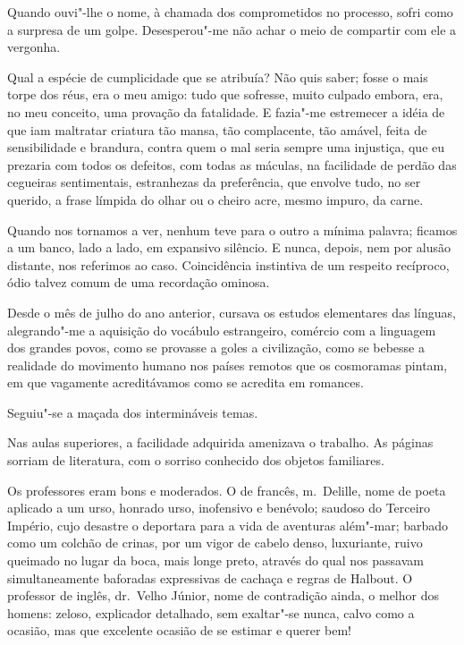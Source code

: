 Quando ouvi"-lhe o nome, à chamada dos
comprometidos no processo, sofri como a surpresa de um golpe.
Desesperou"-me não achar o meio de compartir com ele a vergonha. 

Qual a espécie de cumplicidade que se atribuía? Não quis saber; fosse o mais
torpe dos réus, era o meu amigo: tudo que sofresse, muito culpado
embora, era, no meu conceito, uma provação da fatalidade. E fazia"-me
estremecer a idéia de que iam maltratar criatura tão mansa, tão
complacente, tão amável, feita de sensibilidade e brandura, contra quem
o mal seria sempre uma injustiça, que eu prezaria com todos os
defeitos, com todas as máculas, na facilidade de perdão das cegueiras
sentimentais, estranhezas da preferência, que envolve tudo, no ser
querido, a frase límpida do olhar ou o cheiro acre, mesmo impuro, da
carne. 

Quando nos tornamos a ver, nenhum teve para o outro a mínima
palavra; ficamos a um banco, lado a lado, em expansivo silêncio. E
nunca, depois, nem por alusão distante, nos referimos ao caso.
Coincidência instintiva de um respeito recíproco, ódio talvez comum de
uma recordação ominosa. 

Desde o mês de julho do ano anterior, cursava
os estudos elementares das línguas, alegrando"-me a aquisição do
vocábulo estrangeiro, comércio com a linguagem dos grandes povos, como
se provasse a goles a civilização, como se bebesse a realidade do
movimento humano nos países remotos que os cosmoramas pintam, em que
vagamente acreditávamos como se acredita em romances. 

Seguiu"-se a maçada dos intermináveis temas. 

Nas aulas superiores, a facilidade
adquirida amenizava o trabalho. As páginas sorriam de literatura, com o
sorriso conhecido dos objetos familiares.

Os professores eram bons e moderados. O de francês, m.~Delille, nome de
poeta aplicado a um urso, honrado urso, inofensivo e benévolo; saudoso
do Terceiro Império, cujo desastre o deportara para a vida de aventuras
além"-mar; barbado como um colchão de crinas, por um vigor de cabelo
denso, luxuriante, ruivo queimado no lugar da boca, mais longe preto,
através do qual nos passavam simultaneamente baforadas expressivas de
cachaça e regras de Halbout. O professor de inglês, dr.~Velho Júnior,
nome de contradição ainda, o melhor dos homens: zeloso, explicador
detalhado, sem exaltar"-se nunca, calvo como a ocasião, mas que
excelente ocasião de se estimar e querer bem! 

